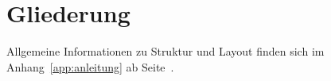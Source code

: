 \documentclass[	12pt, 
				a4paper, 
				BCOR=10mm, %
				DIV=12, 
				parskip=half, %
				headings=small, %
				twoside, %
				ngerman,
				bibliography=totoc,index=totoc, listof=totoc,
				numbers=noendperiod
				]{scrbook} %
\theoremstyle{plain}%
\theoremstyle{definition}
\theoremstyle{remark}
\begin{document}

\renewcommand{\thestatement}{Hiermit erkläre ich, dass ich die vorliegende Arbeit selbständig und ohne Benutzung anderer als der angegebenen Hilfsmittel angefertigt habe.

Alle Stellen, die wörtlich oder sinngemäß aus veröffentlichten oder nicht veröffentlichten Schriften entnommen wurden, sind als solche kenntlich gemacht.

Die Arbeit hat in gleicher oder ähnlicher Form noch keiner anderen Prüfungsbehörde vorgelegen.\\[1cm]

Würzburg, \today\\[1cm]

Vorname Nachname
}


\frontmatter%
\begin{spacing}{1}

\printthetitlepage

\printthededication	
\end{spacing}




\begin{spacing}{1}

\tableofcontents 	

\listoffigures 		

\listoftables		

\printglossary[type=\acronymtype] 

\end{spacing}


\mainmatter %

\chapter{Gliederung}
Allgemeine Informationen zu Struktur und Layout finden sich im Anhang~\ref{app:anleitung} ab Seite~\pageref{app:anleitung}.
\end{document}
